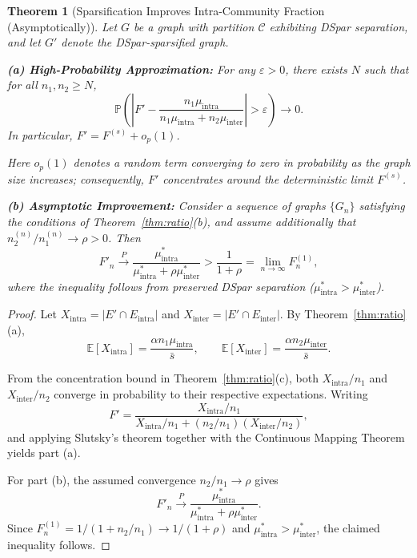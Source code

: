 \documentclass[10pt,journal,compsoc]{IEEEtran}
\newtheorem{theorem}{Theorem}
\begin{document}
\begin{theorem}[Sparsification Improves Intra-Community Fraction (Asymptotically)]
\label{thm:sparsification}
Let $G$ be a graph with partition $\mathcal{C}$ exhibiting DSpar separation, and
let $G'$ denote the DSpar-sparsified graph.

\textbf{(a) High-Probability Approximation:}
For any $\varepsilon > 0$, there exists $N$ such that for all $n_1,n_2 \ge N$,
\begin{equation}
\mathbb{P}\!\left(
\left| F' -
\frac{n_1 \mu_{\text{intra}}}{n_1 \mu_{\text{intra}} + n_2 \mu_{\text{inter}}}
\right| > \varepsilon
\right) \to 0.
\end{equation}
In particular, $F' = F^{(s)} + o_p(1)$.

Here $o_p(1)$ denotes a random term converging to zero in probability as the graph size increases; consequently, $F'$ concentrates around the deterministic limit $F^{(s)}$.

\textbf{(b) Asymptotic Improvement:}
Consider a sequence of graphs $\{G_n\}$ satisfying the conditions of
Theorem~\ref{thm:ratio}(b), and assume additionally that
$n_2^{(n)}/n_1^{(n)} \to \rho > 0$. Then
\begin{equation}
F'_n \xrightarrow{P}
\frac{\mu_{\text{intra}}^*}{\mu_{\text{intra}}^* + \rho \mu_{\text{inter}}^*}
>
\frac{1}{1+\rho}
= \lim_{n \to \infty} F^{(1)}_n,
\end{equation}
where the inequality follows from preserved DSpar separation
($\mu_{\text{intra}}^* > \mu_{\text{inter}}^*$).
\end{theorem}

\begin{proof}
Let $X_{\text{intra}} = |E' \cap E_{\text{intra}}|$ and
$X_{\text{inter}} = |E' \cap E_{\text{inter}}|$. By Theorem~\ref{thm:ratio}(a),
\begin{equation}
\mathbb{E}[X_{\text{intra}}]
= \frac{\alpha n_1 \mu_{\text{intra}}}{\bar{s}}, \qquad
\mathbb{E}[X_{\text{inter}}]
= \frac{\alpha n_2 \mu_{\text{inter}}}{\bar{s}}.
\end{equation}

From the concentration bound in Theorem~\ref{thm:ratio}(c), both
$X_{\text{intra}}/n_1$ and $X_{\text{inter}}/n_2$ converge in probability to
their respective expectations. Writing
\begin{equation}
F'
= \frac{X_{\text{intra}}/n_1}
{X_{\text{intra}}/n_1 + (n_2/n_1)(X_{\text{inter}}/n_2)},
\end{equation}
and applying Slutsky’s theorem together with the Continuous Mapping Theorem
yields part (a).

For part (b), the assumed convergence $n_2/n_1 \to \rho$ gives
\begin{equation}
F'_n \xrightarrow{P}
\frac{\mu_{\text{intra}}^*}{\mu_{\text{intra}}^* + \rho \mu_{\text{inter}}^*}.
\end{equation}
Since $F^{(1)}_n = 1/(1+n_2/n_1) \to 1/(1+\rho)$ and
$\mu_{\text{intra}}^* > \mu_{\text{inter}}^*$, the claimed inequality follows.
\end{proof}
\end{document}
